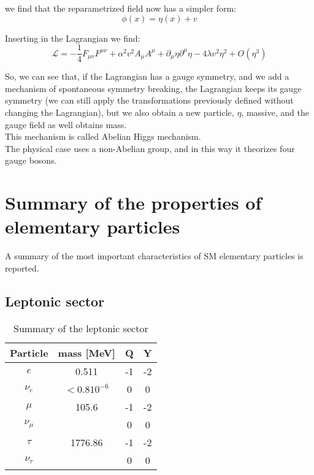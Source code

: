 we find that the reparametrized field now has a simpler form:
\begin{equation}
    \phi(x) = \eta(x) + v
\end{equation}

Inserting in the Lagrangian we find:
\begin{equation}
      \mathcal{L}= - \frac{1}{4} F_{\mu\nu}F^{\mu\nu} + \alpha^2 v^2A_{\mu}A^{\mu} + \partial_{\mu}\eta\partial^{\mu}\eta - 4 \lambda v^2 \eta^2 + O(\eta^3)
\end{equation}

So, we can see that, if the Lagrangian has a gauge symmetry, and we add a mechanism of spontaneous symmetry breaking, the Lagrangian keeps its gauge symmetry (we can still apply the transformations previously defined without changing the Lagrangian), but we also obtain a new particle, $\eta$, massive, and the gauge field as well obtains mass.\\
This mechanism is called Abelian Higgs mechanism.\\
The physical case uses a non-Abelian group, and in this way it theorizes four gauge bosons.

\chapter{Summary of the properties of elementary particles}
\label{app_particles}
A summary of the most important characteristics of SM elementary particles is reported.
\section{Leptonic sector}
\begin{table}[hb]
    \centering
    \begin{tabular}{c|c|c|c}
         Particle & mass [MeV]& Q & Y \\ \hline
         $e$ & 0.511 & -1  & -2\\ \hline
         $\nu_e$& $<0.8 10^{-6}$& 0 & 0 \\\hline    
         $\mu$ & 105.6& -1 &-2 \\\hline
         $\nu_{\mu}$ & & 0  & 0\\\hline
         $\tau$ & 1776.86 & -1 & -2\\\hline
         $\nu_{\tau}$ & & 0 & 0\\\hline
         
        
    \end{tabular}
    \caption{Summary of the leptonic sector}
    \label{lepton_summary}
\end{table}
